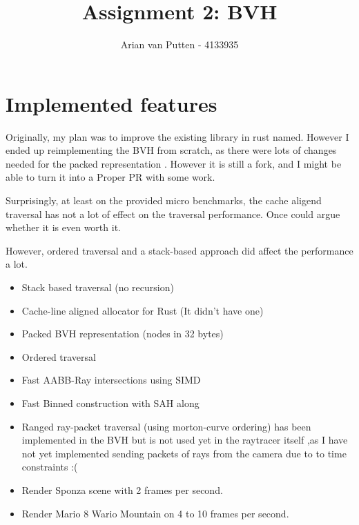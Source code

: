 \documentclass{article}
\title{Assignment 2: BVH}
\author{Arian van Putten - 4133935}
\begin{document}
\maketitle

\section{Implemented features}

Originally, my plan was to improve the  existing library
in rust named. However
I ended up reimplementing the BVH from scratch, as there
were lots of changes needed for the packed representation . However
it is still a fork, and I might be able to turn it into a Proper PR with some work.

Surprisingly, at least on the provided micro benchmarks, the cache aligend
traversal has not a lot of effect on the traversal performance. Once
could argue whether it is even worth it.

However, ordered traversal and a stack-based approach did affect the
performance a lot.


\begin{itemize}
  \item Stack based traversal (no recursion)
  \item Cache-line aligned allocator for Rust (It didn't have one)
  \item Packed BVH representation (nodes in 32 bytes)
  \item Ordered traversal
  \item Fast AABB-Ray intersections using SIMD
  \item Fast Binned construction with SAH along
  \item Ranged ray-packet traversal (using morton-curve ordering)
    has been implemented in the BVH  
    but is not used yet in the raytracer itself ,as I have not yet
    implemented sending packets of rays from the camera due to to time constraints :(
  \item Render Sponza scene with 2 frames per second.
  \item Render Mario 8 Wario Mountain on 4 to 10 frames per second.
\end{itemize}
\end{document}
